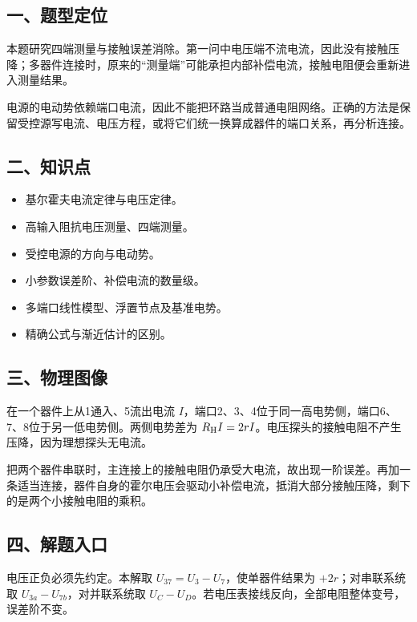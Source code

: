 \documentclass[12pt,a4paper,fontset=fandol]{ctexart}
\providecommand{\tightlist}{\setlength{\itemsep}{0pt}\setlength{\parskip}{0pt}}
\begin{document}
\subsection{一、题型定位}\label{ux4e00ux9898ux578bux5b9aux4f4d-2}

本题研究四端测量与接触误差消除。第一问中电压端不流电流，因此没有接触压降；多器件连接时，原来的``测量端''可能承担内部补偿电流，接触电阻便会重新进入测量结果。

电源的电动势依赖端口电流，因此不能把环路当成普通电阻网络。正确的方法是保留受控源写电流、电压方程，或将它们统一换算成器件的端口关系，再分析连接。

\subsection{二、知识点}\label{ux4e8cux77e5ux8bc6ux70b9-2}

\begin{itemize}
\tightlist
\item
  基尔霍夫电流定律与电压定律。
\item
  高输入阻抗电压测量、四端测量。
\item
  受控电源的方向与电动势。
\item
  小参数误差阶、补偿电流的数量级。
\item
  多端口线性模型、浮置节点及基准电势。
\item
  精确公式与渐近估计的区别。
\end{itemize}

\subsection{三、物理图像}\label{ux4e09ux7269ux7406ux56feux50cf-2}

在一个器件上从1通入、5流出电流
\(I\)，端口2、3、4位于同一高电势侧，端口6、7、8位于另一低电势侧。两侧电势差为
\(R_{\rm H}I=2rI\)。电压探头的接触电阻不产生压降，因为理想探头无电流。

把两个器件串联时，主连接上的接触电阻仍承受大电流，故出现一阶误差。再加一条适当连接，器件自身的霍尔电压会驱动小补偿电流，抵消大部分接触压降，剩下的是两个小接触电阻的乘积。

\subsection{四、解题入口}\label{ux56dbux89e3ux9898ux5165ux53e3-2}

电压正负必须先约定。本解取 \(U_{37}=U_3-U_7\)，使单器件结果为
\(+2r\)；对串联系统取 \(U_{3a}-U_{7b}\)，对并联系统取
\(U_C-U_D\)。若电压表接线反向，全部电阻整体变号，误差阶不变。
\end{document}
